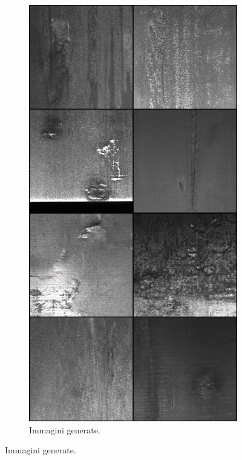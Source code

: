 \begin{figure}[htpb]
    \hfill
    \begin{subfigure}[b]{0.3\textwidth}
        \includegraphics[width=\textwidth]{imgs/Coigan/results/buone/media_images_fake_image_210000_c481d86d1cc2f7258c70.png}
        \caption{Immagini generate.}

\end{subfigure}
\end{figure}
